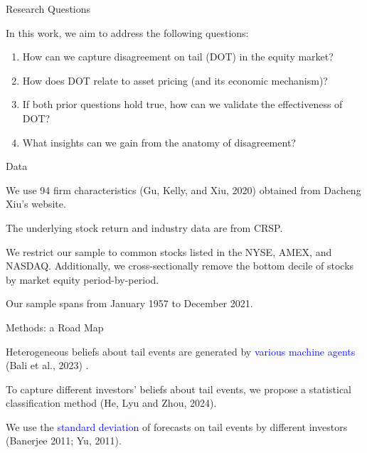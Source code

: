 \documentclass[11pt, aspectratio=169]{beamer}
\newenvironment{wideitemize}{\itemize\addtolength{\itemsep}{10pt}}{\enditemize}
\begin{document}
\begin{frame}{Research Questions}
    \bigskip
    \begin{wideitemize}
    \item In this work, we aim to address the following questions:
    \bigskip
    \begin{enumerate}
        \item How can we \alert{capture} disagreement on tail (DOT) in the equity market?
        \bigskip
        \item How does DOT relate to \alert{asset pricing} (and its economic mechanism)?
        \bigskip
        \item If both prior questions hold true, how can we \alert{validate} the effectiveness of DOT?
        \bigskip
        \item What insights can we gain from the \alert{anatomy} of disagreement?
    \end{enumerate}
    \end{wideitemize}
\end{frame}

\begin{frame}{Data}
    \bigskip
    \begin{wideitemize}
    \item We use 94 firm characteristics (Gu, Kelly, and Xiu, 2020) obtained from Dacheng Xiu's website.
    \item The underlying stock return and industry data are from CRSP.
    \item We restrict our sample to common stocks listed in the NYSE, AMEX, and NASDAQ. Additionally, we cross-sectionally remove the bottom decile of stocks by market equity period-by-period.
    \item Our sample spans from January 1957 to December 2021.
    \end{wideitemize}
\end{frame}



\begin{frame}{Methods: a Road Map}
    \bigskip
    \begin{wideitemize}
    \item Heterogeneous beliefs about tail events are generated by \textcolor{blue}{various machine agents} (Bali et al., 2023) .
    
    \item To capture different investors' beliefs about tail events, we propose a statistical \alert{classification} method (He, Lyu and Zhou, 2024).

    \item We use the \textcolor{blue}{standard deviation} of forecasts on tail events by different investors (Banerjee 2011; Yu, 2011).
    \end{wideitemize}
\end{frame}
\end{document}

